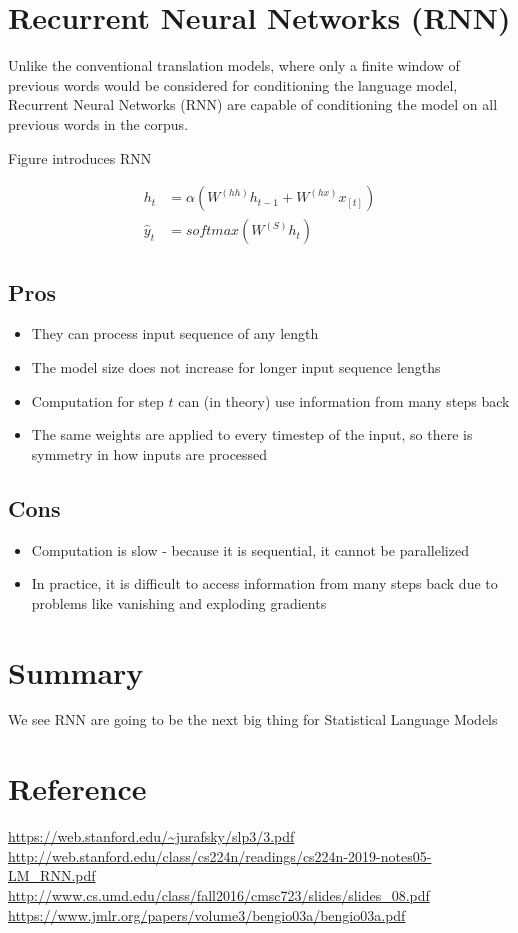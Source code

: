 \documentclass[letterpaper]{article}
\begin{document}
\section{Recurrent Neural Networks (RNN)}
Unlike the conventional translation models, where only a finite
window of previous words would be considered for conditioning
the language model, Recurrent Neural Networks (RNN) are capable
of conditioning the model on all previous words in the corpus.

Figure introduces RNN

\begin{align}
	h_t &= \alpha(W^{(hh)}h_{t-1} + W^{(hx)}x_{[t]}) \\
	\hat{y}_{t} &= softmax(W^{(S)}h_t)
\end{align}

\subsection{Pros}
\begin{itemize}
	\item They can process input sequence of any length
	\item The model size does not increase for longer input sequence lengths
	\item Computation for step $t$ can (in theory) use information from many 
	steps back
	\item The same weights are applied to every timestep of the input, so
	there is symmetry in how inputs are processed
\end{itemize}

\subsection{Cons}
\begin{itemize}
	\item Computation is slow - because it is sequential, it cannot be
	parallelized
	\item In practice, it is difficult to access information from many steps
	back due to problems like vanishing and exploding gradients
\end{itemize}



\section{Summary}
We see RNN are going to be the next big thing for Statistical Language Models


\section{Reference}
\url{https://web.stanford.edu/~jurafsky/slp3/3.pdf}
\url{http://web.stanford.edu/class/cs224n/readings/cs224n-2019-notes05-LM_RNN.pdf}
\url{http://www.cs.umd.edu/class/fall2016/cmsc723/slides/slides_08.pdf}
\url{https://www.jmlr.org/papers/volume3/bengio03a/bengio03a.pdf}
\end{document}
